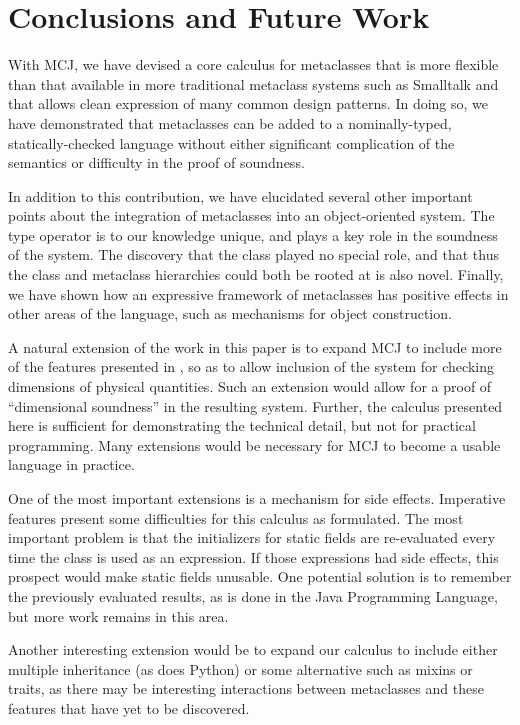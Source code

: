 \documentclass[nocopyrightspace,10pt]{acm-sigplan}
\begin{document}
\section{Conclusions and Future Work}
\label{future}
With MCJ, we have devised a core calculus for metaclasses that is more
flexible than that available in more traditional metaclass systems
such as Smalltalk and that allows clean expression of many common
design patterns.  In doing so, we have demonstrated that metaclasses
can be added to a nominally-typed, statically-checked language without
either significant complication of the semantics or difficulty in the
proof of soundness.

In addition to this contribution, we have elucidated several other
important points about the integration of metaclasses into an
object-oriented system.  The {} type operator is to our
knowledge unique, and plays a key role in the soundness of the
system.  The discovery that the {} class played no special
role, and that thus the class and metaclass hierarchies could both be
rooted at {} is also novel.  Finally, we have shown how an
expressive framework of metaclasses has positive effects in other
areas of the language, such as mechanisms for object construction.  

A natural extension of the work in this paper is to expand MCJ to
include more of the features presented in \cite{DimUnits}, so as to
allow inclusion of the system for checking dimensions of physical
quantities. Such an extension would allow for a proof of  ``dimensional
soundness'' in the resulting system.  Further, the calculus presented
here is sufficient for demonstrating the technical detail, but not for
practical programming.  Many extensions would be necessary for MCJ to
become a usable language in practice.

One of the most important extensions is a mechanism for side effects.
Imperative features present some difficulties for this calculus as
formulated.  The most important problem is that the initializers for
static fields are re-evaluated every time the class is used as an
expression.  If those expressions had side effects, this prospect
would make static fields unusable.  One potential solution is to
remember the previously evaluated results, as is done in the Java
Programming Language, but more work remains in this area.

Another interesting extension would be to expand our calculus to
include either multiple inheritance (as does Python) or some
alternative such as mixins or traits, as there may be interesting
interactions between metaclasses and these features that have yet to
be discovered.
\end{document}
